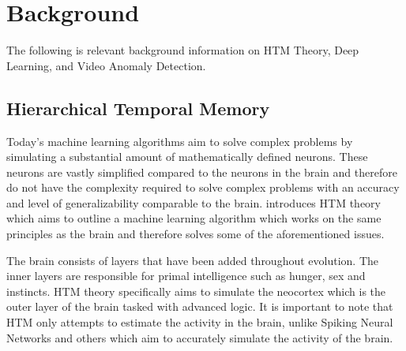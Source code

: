 \chapter{Background}
The following is relevant background information on HTM Theory, Deep Learning, and Video Anomaly Detection.
\section{Hierarchical Temporal Memory}
Today's machine learning algorithms aim to solve complex problems by simulating a substantial amount of mathematically defined neurons. These neurons are vastly simplified compared to the neurons in the brain and therefore do not have the complexity required to solve complex problems with an accuracy and level of generalizability comparable to the brain. \cite{BAMI} introduces HTM theory which aims to outline a machine learning algorithm which works on the same principles as the brain and therefore solves some of the aforementioned issues.\par
The brain consists of layers that have been added throughout evolution. The inner layers are responsible for primal intelligence such as hunger, sex and instincts. HTM theory specifically aims to simulate the neocortex which is the outer layer of the brain tasked with advanced logic. It is important to note that HTM only attempts to estimate the activity in the brain, unlike Spiking Neural Networks and others which aim to accurately simulate the activity of the brain.
